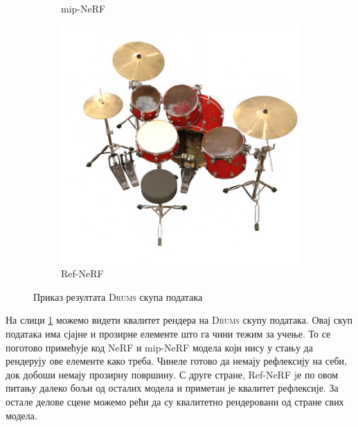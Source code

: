 \documentclass[12pt, a4paper, twoside]{book}
\numberwithin{equation}{chapter}
\numberwithin{theorem}{section}
\numberwithin{definition}{section}
\numberwithin{definitionChapter}{chapter}
\begin{document}
\begin{figure}[H]
\begin{subfigure}{0.475\textwidth}
			\caption{mip-NeRF}
		\end{subfigure}
		\begin{subfigure}{0.475\textwidth}
			\centering
			\includegraphics[scale=0.25]{img/refnerf/refnerf_drums_3.jpg}
			\caption{Ref-NeRF}
		\end{subfigure}
		\caption{Приказ резултата \textsc{Drums} скупа података}
		\label{fig-drums-results}
	\end{figure}

На слици \ref{fig-drums-results} можемо видети квалитет рендера на \textsc{Drums} скупу података.
Овај скуп података има сјајне и прозирне елементе што га чини тежим за учење. То се поготово
примећује код NeRF и mip-NeRF модела који нису у стању да рендерују ове елементе како треба. Чинеле
готово да немају рефлексију на себи, док добоши немају прозирну површину. С друге стране, Ref-NeRF jе
по овом питању далеко бољи од осталих модела и приметан је квалитет рефлексије.
За остале делове сцене можемо рећи да су квалитетно рендеровани од стране свих модела.
\end{document}
